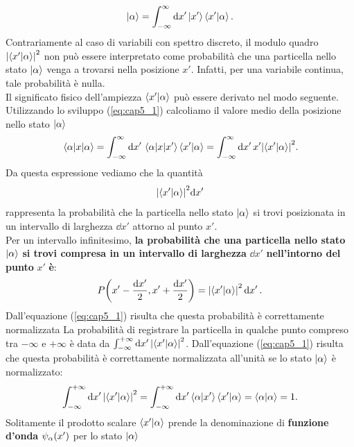 \documentclass[a4paper,12pt,oneside]{book}
\begin{document}
\begin{equation}
  \label{eq:cap5_1}
  \ket{\alpha} = \int_{-\infty}^{\infty}\dd{x'}\ket{x'}\braket{x'}{\alpha} .
\end{equation}
Contrariamente al caso di variabili con spettro discreto, il modulo quadro $\abs{\braket{x'}{\alpha}}^2$ non può essere interpretato come probabilità che una particella nello stato $\ket{\alpha}$ venga a trovarsi nella posizione $x'$. Infatti, per una variabile continua, tale probabilità è nulla.\\
Il significato fisico dell'ampiezza $\braket{x'}{\alpha}$ può essere derivato nel modo seguente.
Utilizzando lo sviluppo (\ref{eq:cap5_1}) calcoliamo il valore medio della posizione nello stato $\ket{\alpha}$
\begin{align}
  \ev{x}{\alpha} = \int_{-\infty}^{\infty}\dd{x'}\mel{\alpha}{x}{x'}\braket{x'}{\alpha}=\int_{-\infty}^{\infty}\dd{x'}x'\abs{\braket{x'}{\alpha}}^2 .
\end{align}
Da questa espressione vediamo che la quantità
\begin{equation}
  \abs{\braket{x'}{\alpha}}^2\dd x'
\end{equation}
rappresenta la probabilità che la particella nello stato $\ket{\alpha}$ si trovi posizionata in un intervallo di larghezza $\dd{x'}$ attorno al punto $x'$.\\
Per un intervallo infinitesimo, \textbf{la probabilità che una particella nello stato }$\ket{\alpha}$ \textbf{si trovi compresa in un intervallo di larghezza }$\dd{x'}$ \textbf{nell'intorno del punto }$x'$ \textbf{è}:
\begin{equation}
  P\qty(x'-\frac{\dd{x'}}{2}, x'+\frac{\dd{x'}}{2}) = \abs{\braket{x'}{\alpha}}^2\dd{x'} .
\end{equation}
Dall'equazione (\ref{eq:cap5_1}) risulta che questa probabilità è correttamente normalizzata
La probabilità di registrare la particella in qualche punto compreso tra $-\infty$ e $+\infty$ è data da $\int_{-\infty}^{+\infty}\dd{x'}\abs{\braket{x'}{\alpha}}^2$.
Dall'equazione (\ref{eq:cap5_1}) risulta che questa probabilità è correttamente normalizzata all'unità se lo stato $\ket{\alpha}$ è normalizzato:
\begin{equation}
  \label{eq:cap5_2}
  \int_{-\infty}^{+\infty}\dd{x'}\abs{\braket{x'}{\alpha}}^2 = \int_{-\infty}^{+\infty}\dd{x'}\braket{\alpha}{x'}\braket{x'}{\alpha}=\braket{\alpha}{\alpha} = 1 .
\end{equation}
Solitamente il prodotto scalare $\braket{x'}{\alpha}$ prende la denominazione di \textbf{funzione d'onda} $\psi_{\alpha}\qty(x')$ per lo stato $\ket{\alpha}$
\end{document}

